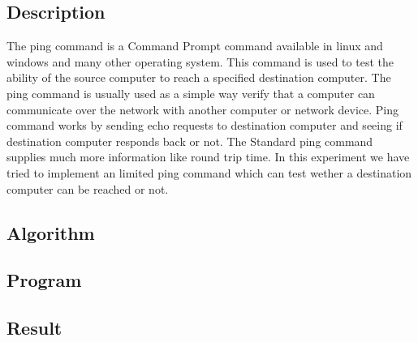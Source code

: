 \subsection{Description}
The ping command is a Command Prompt command available in linux and windows and many other operating system.
This command is used to test the ability of the source computer to reach a specified destination computer. 
The ping command is usually used as a simple way verify that a computer can communicate over the network with another computer or network device.
Ping command works by sending echo requests to destination computer and seeing if destination computer responds back or not.
The Standard ping command supplies much more information like round trip time.
In this experiment we have tried to implement an limited ping command which can test wether a destination computer can be reached or not.

\subsection{Algorithm}

\subsection{Program}


\subsection{Result}\result
